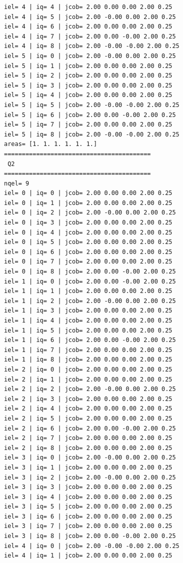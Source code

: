 \begin{tiny}
\begin{verbatim}
iel= 4 | iq= 4 | jcob= 2.00 0.00 0.00 2.00 0.25
iel= 4 | iq= 5 | jcob= 2.00 -0.00 0.00 2.00 0.25
iel= 4 | iq= 6 | jcob= 2.00 0.00 0.00 2.00 0.25
iel= 4 | iq= 7 | jcob= 2.00 0.00 -0.00 2.00 0.25
iel= 4 | iq= 8 | jcob= 2.00 -0.00 -0.00 2.00 0.25
iel= 5 | iq= 0 | jcob= 2.00 -0.00 0.00 2.00 0.25
iel= 5 | iq= 1 | jcob= 2.00 0.00 0.00 2.00 0.25
iel= 5 | iq= 2 | jcob= 2.00 0.00 0.00 2.00 0.25
iel= 5 | iq= 3 | jcob= 2.00 0.00 0.00 2.00 0.25
iel= 5 | iq= 4 | jcob= 2.00 0.00 0.00 2.00 0.25
iel= 5 | iq= 5 | jcob= 2.00 -0.00 -0.00 2.00 0.25
iel= 5 | iq= 6 | jcob= 2.00 0.00 -0.00 2.00 0.25
iel= 5 | iq= 7 | jcob= 2.00 0.00 0.00 2.00 0.25
iel= 5 | iq= 8 | jcob= 2.00 -0.00 -0.00 2.00 0.25
areas= [1. 1. 1. 1. 1. 1.]
=========================================
 Q2
=========================================
nqel= 9
iel= 0 | iq= 0 | jcob= 2.00 0.00 0.00 2.00 0.25
iel= 0 | iq= 1 | jcob= 2.00 0.00 0.00 2.00 0.25
iel= 0 | iq= 2 | jcob= 2.00 -0.00 0.00 2.00 0.25
iel= 0 | iq= 3 | jcob= 2.00 0.00 0.00 2.00 0.25
iel= 0 | iq= 4 | jcob= 2.00 0.00 0.00 2.00 0.25
iel= 0 | iq= 5 | jcob= 2.00 0.00 0.00 2.00 0.25
iel= 0 | iq= 6 | jcob= 2.00 0.00 0.00 2.00 0.25
iel= 0 | iq= 7 | jcob= 2.00 0.00 0.00 2.00 0.25
iel= 0 | iq= 8 | jcob= 2.00 0.00 -0.00 2.00 0.25
iel= 1 | iq= 0 | jcob= 2.00 0.00 -0.00 2.00 0.25
iel= 1 | iq= 1 | jcob= 2.00 0.00 0.00 2.00 0.25
iel= 1 | iq= 2 | jcob= 2.00 -0.00 0.00 2.00 0.25
iel= 1 | iq= 3 | jcob= 2.00 0.00 0.00 2.00 0.25
iel= 1 | iq= 4 | jcob= 2.00 0.00 0.00 2.00 0.25
iel= 1 | iq= 5 | jcob= 2.00 0.00 0.00 2.00 0.25
iel= 1 | iq= 6 | jcob= 2.00 0.00 -0.00 2.00 0.25
iel= 1 | iq= 7 | jcob= 2.00 0.00 0.00 2.00 0.25
iel= 1 | iq= 8 | jcob= 2.00 0.00 0.00 2.00 0.25
iel= 2 | iq= 0 | jcob= 2.00 0.00 0.00 2.00 0.25
iel= 2 | iq= 1 | jcob= 2.00 0.00 0.00 2.00 0.25
iel= 2 | iq= 2 | jcob= 2.00 -0.00 0.00 2.00 0.25
iel= 2 | iq= 3 | jcob= 2.00 0.00 0.00 2.00 0.25
iel= 2 | iq= 4 | jcob= 2.00 0.00 0.00 2.00 0.25
iel= 2 | iq= 5 | jcob= 2.00 0.00 0.00 2.00 0.25
iel= 2 | iq= 6 | jcob= 2.00 0.00 -0.00 2.00 0.25
iel= 2 | iq= 7 | jcob= 2.00 0.00 0.00 2.00 0.25
iel= 2 | iq= 8 | jcob= 2.00 0.00 0.00 2.00 0.25
iel= 3 | iq= 0 | jcob= 2.00 -0.00 0.00 2.00 0.25
iel= 3 | iq= 1 | jcob= 2.00 0.00 0.00 2.00 0.25
iel= 3 | iq= 2 | jcob= 2.00 -0.00 0.00 2.00 0.25
iel= 3 | iq= 3 | jcob= 2.00 0.00 0.00 2.00 0.25
iel= 3 | iq= 4 | jcob= 2.00 0.00 0.00 2.00 0.25
iel= 3 | iq= 5 | jcob= 2.00 0.00 0.00 2.00 0.25
iel= 3 | iq= 6 | jcob= 2.00 0.00 0.00 2.00 0.25
iel= 3 | iq= 7 | jcob= 2.00 0.00 0.00 2.00 0.25
iel= 3 | iq= 8 | jcob= 2.00 0.00 -0.00 2.00 0.25
iel= 4 | iq= 0 | jcob= 2.00 -0.00 -0.00 2.00 0.25
iel= 4 | iq= 1 | jcob= 2.00 0.00 0.00 2.00 0.25

\end{verbatim}
\end{tiny}
